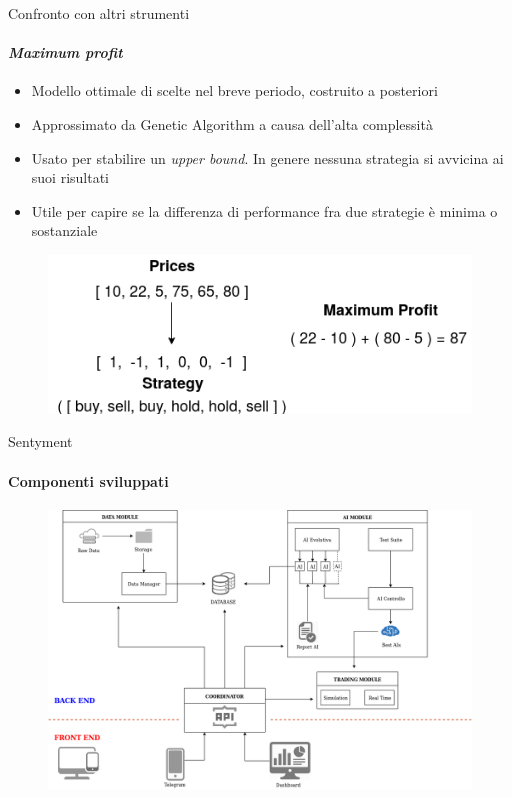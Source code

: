 \documentclass{beamer}
\begin{document}
\begin{frame}{Confronto con altri strumenti}
\framesubtitle{\textit{Maximum profit}}
\begin{itemize}
\item Modello ottimale di scelte nel breve periodo, costruito a posteriori
\item Approssimato da Genetic Algorithm a causa dell'alta complessità
\item Usato per stabilire un \textit{upper bound}. In genere nessuna strategia si avvicina ai suoi risultati
\item Utile per capire se la differenza di performance fra due strategie è minima o sostanziale
\end{itemize}
\begin{figure}
        \centering
        \includegraphics[width=.5\linewidth]{maxprof}
\end{figure}
\end{frame}


\begin{frame}{Sentyment}
\framesubtitle{Componenti sviluppati}
\begin{figure}
        \centering
        \includegraphics[width=.9\linewidth]{Sentyment}
\end{figure}
\end{frame}
\end{document}
